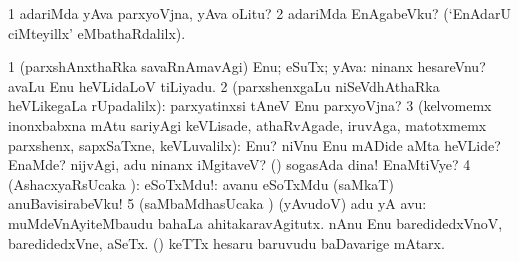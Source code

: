 {{{{{{\noindent 
\gl{\pagu}
\expl{}
\bmng
\bnum
\num{1}  adariMda yAva parxyoVjna, yAva oLitu? 
\num{2}  adariMda EnAgabeVku? (`EnAdarU ciMteyillx' eMbathaRdalilx). 
\enum
\emng
\eentry

\bentry
{} 
\gl{\sanA}
\expl{}
\bmng
\bnum
\num{1} (parxshAnxthaRka savaRnAmavAgi) Enu; eSuTx; yAva:  ninanx hesareVnu?  avaLu Enu heVLidaLoV tiLiyadu. 
\num{2} (parxshenxgaLu niSeVdhAthaRka heVLikegaLa rUpadalilx):  parxyatinxsi tAneV Enu parxyoVjna? 
\num{3} (kelvomemx inonxbabxna mAtu sariyAgi keVLisade, athaRvAgade, iruvAga, matotxmemx parxshenx, sapxSaTxne, keVLuvalilx):  Enu? niVnu Enu mADide aMta heVLide?  EnaMde? nijvAgi, adu ninanx iMgitaveV? (\AmA)  sogasAda dina! EnaMtiVye? 
\num{4} (AshacxyaRsUcaka \sanA): eSoTxMdu!:  avanu eSoTxMdu (saMkaT) anuBavisirabeVku! 
\hypertarget{what(2)5}{} 
\hypertarget{what2 pagu5}{} 
\num{5} (saMbaMdhasUcaka \sanA) (yAvudoV) adu yA avu:  muMdeVnAyiteMbaudu bahaLa ahitakaravAgitutx.  nAnu Enu baredidedxVnoV, baredidedxVne, aSeTx.  (\ashi) keTTx hesaru baruvudu baDavarige mAtarx. 
\enum
\emng

}}}}}}
